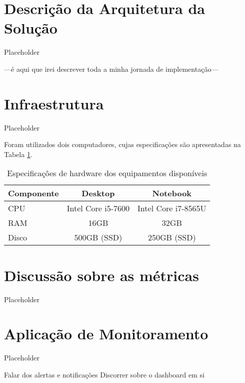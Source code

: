 




\section{Descrição da Arquitetura da Solução}

Placeholder

---é aqui que irei descrever toda a minha jornada de implementação---

\section{Infraestrutura}

Placeholder


Foram utilizados dois computadores, cujas especificações são apresentadas na Tabela \ref{tab:available-hardware}.

\begin{table}[H]
\centering
\caption{Especificações de hardware dos equipamentos disponíveis}
\label{tab:available-hardware}
\begin{tabular}{lcc}
\toprule
\textbf{Componente} & \textbf{Desktop} & \textbf{Notebook} \\
\midrule
CPU   & Intel Core i5-7600   & Intel Core i7-8565U \\
RAM   & 16GB                 & 32GB                \\
Disco & 500GB (SSD)            & 250GB (SSD)          \\
\bottomrule
\end{tabular}
\end{table}



\section{Discussão sobre as métricas}

Placeholder

\section{Aplicação de Monitoramento}

Placeholder

Falar dos alertas e notificações
Discorrer sobre o dashboard em si